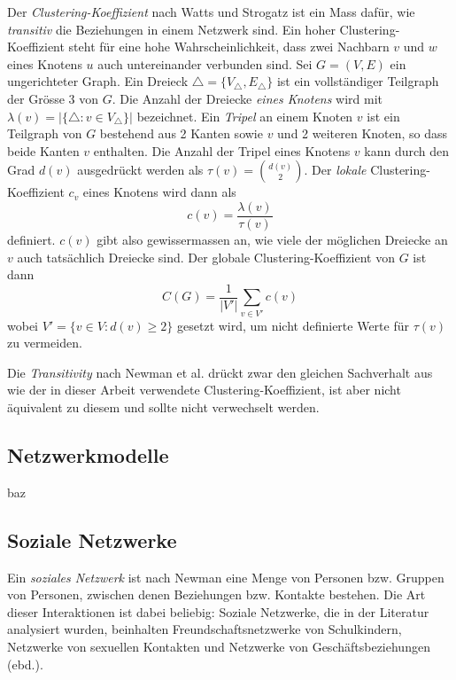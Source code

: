 Der \emph{Clustering-Koeffizient} nach Watts und Strogatz ist ein Mass
daf\"ur, wie \emph{transitiv} die Beziehungen in einem Netzwerk
sind. Ein hoher Clustering-Koeffizient steht f\"ur eine hohe
Wahrscheinlichkeit, dass zwei Nachbarn $v$ und $w$ eines Knotens $u$
auch untereinander verbunden sind. Sei $G = (V, E)$ ein ungerichteter
Graph. Ein Dreieck $\bigtriangleup = \{V_{\bigtriangleup},
E_{\bigtriangleup}\}$ ist ein vollst\"andiger Teilgraph der Gr\"osse 3
von $G$. Die Anzahl der Dreiecke \emph{eines Knotens} wird mit
$\lambda(v) = |\{\bigtriangleup : v \in V_{\bigtriangleup}\}|$
bezeichnet. Ein \emph{Tripel} an einem Knoten $v$ ist ein Teilgraph
von $G$ bestehend aus 2 Kanten sowie $v$ und 2 weiteren Knoten, so
dass beide Kanten $v$ enthalten. Die Anzahl der Tripel eines Knotens
$v$ kann durch den Grad $d(v)$ ausgedr\"uckt werden als
$\tau(v)=\binom{d(v)}{2}$. Der \emph{lokale} Clustering-Koeffizient
$c_v$ eines Knotens wird dann als
\begin{equation}
  \label{eq:5}
  c(v) = \frac{\lambda(v)}{\tau(v)}
\end{equation}
definiert. $c(v)$ gibt also gewissermassen an, wie viele der
m\"oglichen Dreiecke an $v$ auch tats\"achlich Dreiecke sind. Der
globale Clustering-Koeffizient von $G$ ist dann
\begin{equation}
  \label{eq:6}
  C(G) = \frac{1}{|V'|} \sum_{v \in V'}c(v)
\end{equation}
wobei $V' = \{v \in V : d(v) \ge 2\}$ gesetzt wird, um nicht
definierte Werte f\"ur $\tau(v)$ zu vermeiden.

Die \emph{Transitivity} nach Newman et al. dr\"uckt zwar den gleichen
Sachverhalt aus wie der in dieser Arbeit verwendete
Clustering-Koeffizient, ist aber nicht \"aquivalent zu diesem und
sollte nicht verwechselt werden.

\subsection{Netzwerkmodelle}
\label{sec:netzwerkmodelle}

\cite{Barabasi1999} 
baz

\subsection{Soziale Netzwerke}
\label{sec:soziale-netzwerke}

Ein \emph{soziales Netzwerk} ist nach Newman\cite{newman:167} eine
Menge von Personen bzw. Gruppen von Personen, zwischen denen
Beziehungen bzw. Kontakte bestehen. Die Art dieser Interaktionen ist
dabei beliebig: Soziale Netzwerke, die in der Literatur analysiert
wurden, beinhalten Freundschaftsnetzwerke von Schulkindern, Netzwerke
von sexuellen Kontakten und Netzwerke von Gesch\"aftsbeziehungen
(ebd.).

